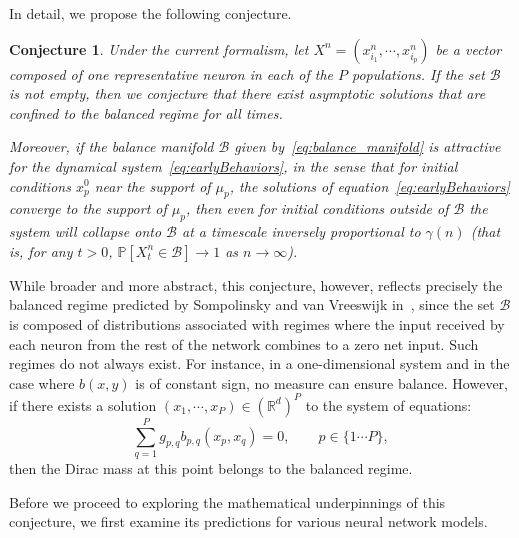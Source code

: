 \documentclass[onefignum,onetabnum]{siamart190516}
\newtheorem{conjecture}{Conjecture}
\newcommand{\R}{\mathbb{R}}
\renewcommand{\P}{\mathbb{P}}
\newcommand{\1}{\mathbbm{1}}
\newcommand{\B}{\mathcal{B}}
\newcommand{\review}[1]{\textcolor{midblue}{ #1}}
\renewcommand{\review}[1]{{ #1}}
\begin{document}
In detail, we propose the following conjecture. 

\begin{conjecture}\label{conjecture}
\review{Under the current formalism, let $X^n=(x^n_{i_1},\cdots, x^{n}_{i_p})$ be a vector composed of one representative neuron in each of the $P$ populations. 
If the set $\B$ is not empty, then we conjecture that there exist asymptotic solutions that are confined to the balanced regime for all times. }

\review{Moreover, if the balance manifold $\B$ given by~\eqref{eq:balance_manifold} \review{is} \emph{attractive} for the dynamical system~\eqref{eq:earlyBehaviors}, in the sense that for initial conditions $x_p^0$ near the support of $\mu_p$, the solutions of equation~\eqref{eq:earlyBehaviors} converge to the support of $\mu_p$, then even for initial conditions outside of $\B$ the system will collapse onto $\B$ at a timescale inversely proportional to $\gamma(n)$ (that is,  for any $t>0$, $\P[X^n_t\in \B]\to 1$ as $n\to \infty$). }
\end{conjecture}

\review{While broader and more abstract, this conjecture, however, reflects precisely the balanced regime predicted by Sompolinsky and van Vreeswijk in~\cite{sompolinsky-van-vreeswijk}, since the set $\B$ is composed of distributions associated with regimes where the input received by each neuron from the rest of the network combines to a zero net input.} Such regimes do not always exist. For instance, in a one-dimensional system and in the case where $b(x,y)$ is of constant sign, no measure can ensure balance. However, if there exists a solution $(x_1,\cdots,x_P)\in (\R^d)^P$ to the system of equations:
\[\sum_{q=1}^{P} g_{p,q}  b_{p,q}(x_p,x_q) \review{= 0}, \qquad p\in \{1\cdots P\},\]
then the Dirac mass at this point belongs to the balanced regime.

\review{Before we proceed to exploring the mathematical underpinnings of this conjecture, we first examine its predictions for various neural network models. }
\end{document}
